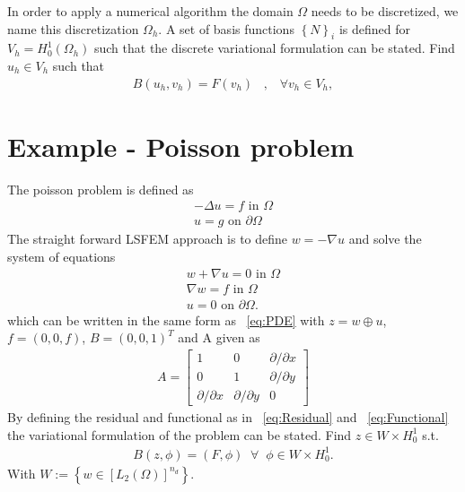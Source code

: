 In order to apply a numerical algorithm the domain $\Omega$ needs to be discretized, we name this discretization $\Omega_h$. A set of basis functions $ \left\{ N \right\}_i $ is defined for $V_h = H^1_0(\Omega_h)$ such that the discrete variational formulation can be stated. Find $u_h \in V_h$ such that 
\begin{align}
	B(u_h,v_h) = F(v_h) \; \; \; , \; \; \; \forall v_h \in V_h,
	\label{def:varForm}
\end{align}
\section{Example - Poisson problem}

The poisson problem is defined as 
\begin{align}
	-\Delta u = f \text{ in } \Omega \\
	u = g \text{ on } \partial \Omega
	\label{eq:Poisson}
\end{align}
The straight forward LSFEM approach is to define $w = -\nabla u$ and solve the system of equations 
\begin{align}
	w + \nabla u = 0 \text{ in } \Omega \\
	\nabla w = f \text{ in } \Omega \\
	u = 0 \text{ on } \partial \Omega.
	\label{eq:PoissonSystem}
\end{align}
which can be written in the same form as ~\ref{eq:PDE} with $ z = w \oplus u $, $f = (0,0,f)$, $B = (0,0,1)^T $ and A given as 
\begin{align}
	A =
	\begin{bmatrix}
		1 & 0 & \partial / \partial x  \\
		0 & 1 & \partial / \partial y  \\
		\partial / \partial x & \partial/ \partial y  & 0
	\end{bmatrix}
	\label{eq:Amatrix}
\end{align}
By defining the residual and functional as in ~\ref{eq:Residual} and ~\ref{eq:Functional} the variational formulation of the problem can be stated. Find $ z \in W \times H_0^1$ s.t.
\begin{align}
	B(z,\phi) = (F,\phi) \;\; \forall \;\; \phi \in W \times H_0^1.
	\label{eq:VariationalFormulationPoisson}
\end{align}
With $W := \left\{ w \in \left[L_2(\Omega)\right]^{n_d}\right\}$.
%
